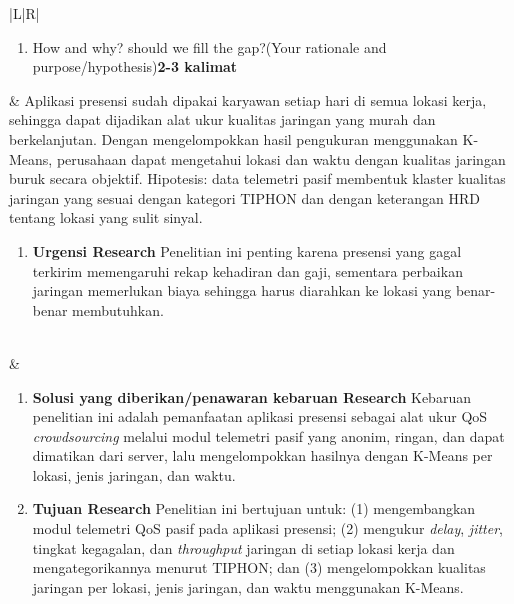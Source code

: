 \documentclass[11pt,a4paper]{article}
\begin{document}
\begin{longtable}{|L|R|}
\begin{enumerate}[label=\arabic*.,start=3]
\item How and why? should we fill the gap?\newline (Your rationale and purpose/hypothesis)\newline \textbf{2-3 kalimat}
\end{enumerate}
&
Aplikasi presensi sudah dipakai karyawan setiap hari di semua lokasi kerja, sehingga dapat dijadikan alat ukur kualitas jaringan yang murah dan berkelanjutan. Dengan mengelompokkan hasil pengukuran menggunakan K-Means, perusahaan dapat mengetahui lokasi dan waktu dengan kualitas jaringan buruk secara objektif. Hipotesis: data telemetri pasif membentuk klaster kualitas jaringan yang sesuai dengan kategori TIPHON dan dengan keterangan HRD tentang lokasi yang sulit sinyal.
\begin{enumerate}[label=\arabic*.]
\item \textbf{Urgensi Research}\newline
Penelitian ini penting karena presensi yang gagal terkirim memengaruhi rekap kehadiran dan gaji, sementara perbaikan jaringan memerlukan biaya sehingga harus diarahkan ke lokasi yang benar-benar membutuhkan.
\end{enumerate}
\\
&
\begin{enumerate}[label=\arabic*.,start=2]
\item \textbf{Solusi yang diberikan/penawaran kebaruan Research}\newline
Kebaruan penelitian ini adalah pemanfaatan aplikasi presensi sebagai alat ukur QoS \textit{crowdsourcing} melalui modul telemetri pasif yang anonim, ringan, dan dapat dimatikan dari server, lalu mengelompokkan hasilnya dengan K-Means per lokasi, jenis jaringan, dan waktu.
\item \textbf{Tujuan Research}\newline
Penelitian ini bertujuan untuk:\newline
(1) mengembangkan modul telemetri QoS pasif pada aplikasi presensi;\newline
(2) mengukur \textit{delay}, \textit{jitter}, tingkat kegagalan, dan \textit{throughput} jaringan di setiap lokasi kerja dan mengategorikannya menurut TIPHON; dan\newline
(3) mengelompokkan kualitas jaringan per lokasi, jenis jaringan, dan waktu menggunakan K-Means.
\end{enumerate}
\\ \hline


\end{longtable}
\end{document}
